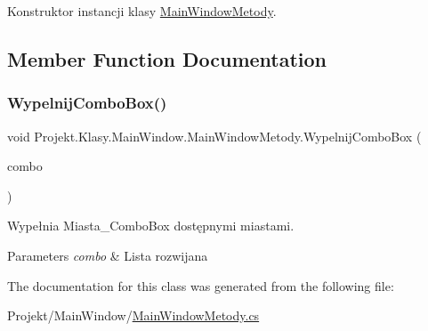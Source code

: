 Konstruktor instancji klasy \mbox{\hyperlink{class_projekt_1_1_klasy_1_1_main_window_1_1_main_window_metody}{Main\+Window\+Metody}}. 



\subsection{Member Function Documentation}
\mbox{\label{class_projekt_1_1_klasy_1_1_main_window_1_1_main_window_metody_a0949895d8b695fb1ae87b383df0ee915}} 
\subsubsection{\texorpdfstring{WypelnijComboBox()}{WypelnijComboBox()}}
{\footnotesize\ttfamily void Projekt.\+Klasy.\+Main\+Window.\+Main\+Window\+Metody.\+Wypelnij\+Combo\+Box (\begin{DoxyParamCaption}\item[{Combo\+Box}]{combo }\end{DoxyParamCaption})}



Wypełnia Miasta\+\_\+\+Combo\+Box dostępnymi miastami. 


\begin{DoxyParams}{Parameters}
{\em combo} & Lista rozwijana\\
\hline
\end{DoxyParams}


The documentation for this class was generated from the following file\+:\begin{DoxyCompactItemize}
\item 
Projekt/\+Main\+Window/\mbox{\hyperlink{_main_window_metody_8cs}{Main\+Window\+Metody.\+cs}}\end{DoxyCompactItemize}

